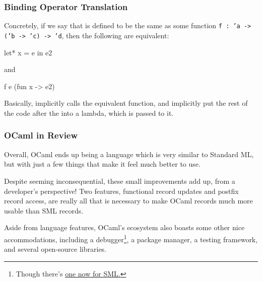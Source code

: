 \documentclass[aspectratio=169, handout]{beamer}
\begin{document}
\begin{frame}[fragile]
  \frametitle{Binding Operator Translation}

  Concretely, if we say that  is defined to be the same as some
  function \texttt{f : 'a -> ('b -> 'c) -> 'd}, then the following are equivalent:

  \vspace{\fill}

  \begin{codeblock}
    let* x = e in
    e2
  \end{codeblock}

  \vspace{\fill}

  and

  \begin{codeblock}
    f e (fun x -> e2)
  \end{codeblock}

  \vspace{\fill}

  Basically,  implicitly calls the equivalent function, and implicitly
  put the rest of the code after the  into a lambda, which is passed
  to it.
\end{frame}


\begin{frame}[fragile]
  \frametitle{OCaml in Review}

  Overall, OCaml ends up being a language which is very similar to Standard ML,
  but with just a few things that make it feel much better to use.

  \vspace{\fill}

  Despite seeming inconsequential, these small improvements add up, from a
  developer's perspective! Two features, functional record updates and postfix
  record access, are really all that is necessary to make OCaml records much
  more usable than SML records.

  \vspace{\fill}

  Aside from language features, OCaml's ecosystem also boasts some other nice
  accommodations, including a debugger\footnote{Though there's {\color{blue}
  \href{https://github.com/brandonspark?tab=repositories}{one now for SML.}}},
  a package manager, a testing framework, and several open-source libraries.
\end{frame}
\end{document}
